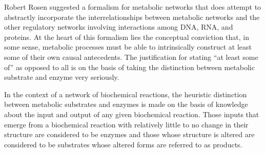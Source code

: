 Robert Rosen suggested a formalism for metabolic networks that does attempt to abstractly incorporate the interrelationships between metabolic networks and the other regulatory networks involving interactions among DNA, RNA, and proteins. At the heart of this formalism lies the conceptual conviction that, in some sense, metabolic processes must be able to intrinsically construct at least some of their own causal antecedents. The justification for stating ``at least some of'' as opposed to all is on the basis of taking the distinction between metabolic substrate and enzyme very seriously.

In the context of a network of biochemical reactions, the heuristic distinction between metabolic substrates and enzymes is made on the basis of knowledge about the input and output of any given biochemical reaction. Those inputs that emerge from a biochemical reaction with relatively little to no change in their structure are considered to be enzymes and those whose structure is altered are considered to be substrates whose altered forms are referred to as products. 

